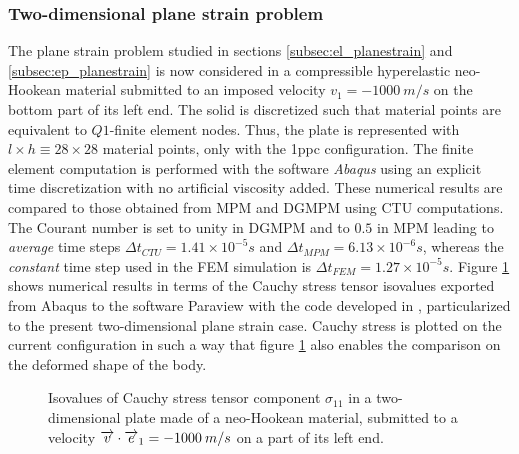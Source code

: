 \subsubsection*{Two-dimensional plane strain problem}
%   
The plane strain problem studied in sections \ref{subsec:el_planestrain} and \ref{subsec:ep_planestrain} is now considered in a compressible hyperelastic neo-Hookean material submitted to an imposed velocity $v_1=-1000 \: m/s$ on the bottom part of its left end.
The solid is discretized such that material points are equivalent to $Q1$-finite element nodes.
Thus, the plate is represented with $l \times h \equiv 28 \times 28$ material points, only with the 1ppc configuration.
The finite element computation is performed with the software \textit{Abaqus} \cite{Abaqus} using an explicit time discretization with no artificial viscosity added.
These numerical results are compared to those obtained from MPM and DGMPM using CTU computations.
The Courant number is set to unity in DGMPM and to $0.5$ in MPM leading to \textit{average} time steps $\Delta t_{CTU}=1.41 \times 10^{-5}s$ and $\Delta t_{MPM}=6.13 \times 10^{-6}s$, whereas the \textit{constant} time step used in the FEM simulation is $\Delta t_{FEM}=1.27 \times 10^{-5} s$.
Figure \ref{fig:2dhe_stress} shows numerical results in terms of the Cauchy stress tensor isovalues exported from Abaqus to the software Paraview \cite{Paraview} with the code developed in \cite{Export_Abaqus}, particularized to the present two-dimensional plane strain case.
Cauchy stress is plotted on the current configuration in such a way that figure \ref{fig:2dhe_stress} also enables the comparison on the deformed shape of the body.
\begin{figure}[h!]
  \centering
  
  \caption{Isovalues of Cauchy stress tensor component $\sigma_{11}$ in a two-dimensional plate made of a neo-Hookean material, submitted to a velocity ${\overrightarrow{v}}\cdot{\overrightarrow{e}}_1=-1000 \: m/s$ on a part of its left end.}
  \label{fig:2dhe_stress}
\end{figure}
